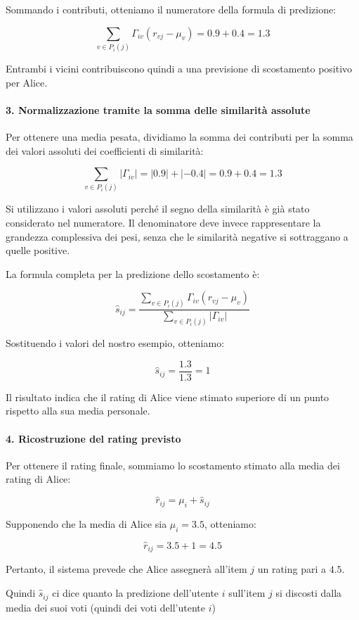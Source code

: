 Sommando i contributi, otteniamo il numeratore della formula di predizione:

\[
\sum_{v\in P_i(j)}
\Gamma_{iv}(r_{vj}-\mu_v)
=0.9+0.4=1.3
\]

Entrambi i vicini contribuiscono quindi a una previsione di scostamento positivo per Alice.

\paragraph{3. Normalizzazione tramite la somma delle similarità assolute}

Per ottenere una media pesata, dividiamo la somma dei contributi per la somma dei valori assoluti dei coefficienti di similarità:

\[
\sum_{v\in P_i(j)}|\Gamma_{iv}|
=|0.9|+|-0.4|=0.9+0.4=1.3
\]

Si utilizzano i valori assoluti perché il segno della similarità è già stato considerato nel numeratore. Il denominatore deve invece rappresentare la grandezza complessiva dei pesi, senza che le similarità negative si sottraggano a quelle positive.

La formula completa per la predizione dello scostamento è:

\[
\hat{s}_{ij}=
\frac{
\displaystyle\sum_{v\in P_i(j)}
\Gamma_{iv}(r_{vj}-\mu_v)
}{
\displaystyle\sum_{v\in P_i(j)}|\Gamma_{iv}|
}
\]

Sostituendo i valori del nostro esempio, otteniamo:

\[
\hat{s}_{ij}=\frac{1.3}{1.3}=1
\]

Il risultato indica che il rating di Alice viene stimato superiore di un punto rispetto alla sua media personale.

\paragraph{4. Ricostruzione del rating previsto}

Per ottenere il rating finale, sommiamo lo scostamento stimato alla media dei rating di Alice:

\[
\hat{r}_{ij}=\mu_i+\hat{s}_{ij}
\]

Supponendo che la media di Alice sia $\mu_i=3.5$, otteniamo:

\[
\hat{r}_{ij}=3.5+1=4.5
\]

Pertanto, il sistema prevede che Alice assegnerà all'item $j$ un rating pari a $4.5$.

\begin{center}
    Quindi $\hat{s}_{ij}$ ci dice quanto la predizione dell'utente $i$ sull'item $j$ si discosti dalla media dei suoi voti (quindi dei voti dell'utente $i$) 
\end{center}

